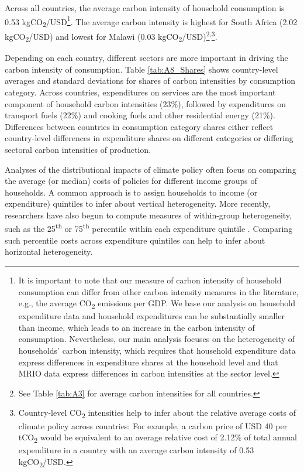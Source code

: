 \documentclass[12pt, a4paper]{article}
\begin{document}
Across all countries, the average carbon intensity of household consumption is 0.53 kgCO\textsubscript{2}/USD\footnote{It is important to note that our measure of carbon intensity of household consumption can differ from other carbon intensity measures in the literature, e.g., the average CO\textsubscript{2} emissions per GDP.  We base our analysis on household expenditure data and household expenditures can be substantially smaller than income, which leads to an increase in the carbon intensity of consumption. Nevertheless, our main analysis focuses on the heterogeneity of households' carbon intensity, which requires that household expenditure data express differences in expenditure shares at the household level and that MRIO data express differences in carbon intensities at the sector level.}. The average carbon intensity is highest for South Africa (2.02 kgCO\textsubscript{2}/USD) and lowest for Malawi (0.03 kgCO\textsubscript{2}/USD)\footnote{See Table \ref{tab:A3} for average carbon intensities for all countries.}\textsuperscript{,}\footnote{Country-level CO\textsubscript{2} intensities help to infer about the relative average costs of climate policy across countries: For example, a carbon price of USD 40 per tCO\textsubscript{2} \autocite{Stiglitz.2017} would be equivalent to an average relative cost of 2.12\% of total annual expenditure in a country with an average carbon intensity of 0.53 kgCO\textsubscript{2}/USD.}.

Depending on each country, different sectors are more important in driving the carbon intensity of consumption. Table \ref{tab:A8_Shares} shows country-level averages and standard deviations for shares of carbon intensities by consumption category. Across countries, expenditures on services are the most important component of household carbon intensities (23\%), followed by expenditures on transport fuels (22\%) and cooking fuels and other residential energy (21\%). Differences between countries in consumption category shares either reflect country-level differences in expenditure shares on different categories or differing sectoral carbon intensities of production.

Analyses of the distributional impacts of climate policy often focus on comparing the average (or median) costs of policies for different income groups of households. A common approach is to assign households to income (or expenditure) quintiles to infer about vertical heterogeneity. More recently, researchers have also begun to compute measures of within-group heterogeneity, such as the 25\textsuperscript{th} or 75\textsuperscript{th} percentile within each expenditure quintile \autocite{Cronin.2019, Missbach.2024}. Comparing such percentile costs across expenditure quintiles can help to infer about horizontal heterogeneity.
\end{document}
